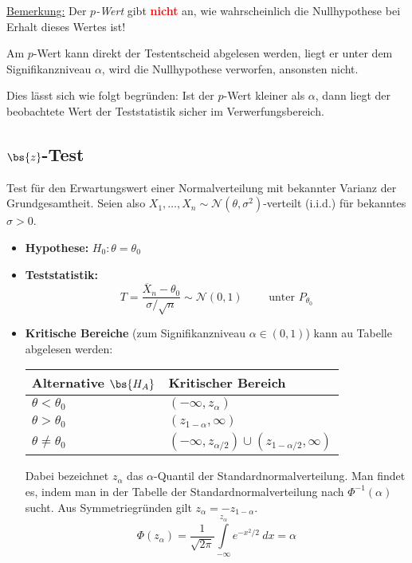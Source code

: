 \underline{Bemerkung:} Der $p$\textit{-Wert} gibt \textcolor{red}{\textbf{nicht}} an, wie wahrscheinlich die Nullhypothese bei Erhalt dieses Wertes ist!\\

\begin{lemma}
Am $p$-Wert kann direkt der Testentscheid abgelesen werden, liegt er unter dem Signifikanzniveau $\alpha$, wird die Nullhypothese verworfen, ansonsten nicht.
\end{lemma}
Dies lässt sich wie folgt begründen: Ist der $p$-Wert kleiner als $\alpha$, dann liegt der beobachtete Wert der Teststatistik sicher im Verwerfungsbereich.

\subsection{$\bs{z}$-Test}
Test für den Erwartungswert einer Normalverteilung mit bekannter Varianz der Grundgesamtheit. Seien also $X_1,\dots,X_n \sim \mathcal{N}(\theta, \sigma^2)$-verteilt (i.i.d.) für bekanntes $\sigma >0$.
\begin{itemize}
\item \textbf{Hypothese:} $H_0 : \theta = \theta_0$
\item \textbf{Teststatistik:} $$ T = \frac{\overline{X}_n - \theta_0}{\sigma / \sqrt{n}} \sim \mathcal{N}(0,1) \quad \quad \mbox{ unter } P_{\theta_0}$$
\item \textbf{Kritische Bereiche} (zum Signifikanzniveau $\alpha \in (0,1)$) kann au Tabelle abgelesen werden:
\begin{table}[htp]
\centering
\label{z-test}
\begin{tabular}{@{}ll@{}}
\toprule
\textbf{Alternative} $\bs{H_A}$                                 & \textbf{Kritischer Bereich}                            \\ \midrule
$\theta < \theta_0$ & $ (-\infty, z_\alpha)$                                 \\
$\theta > \theta_0 $                                       & $ (z_{1-\alpha}, \infty)$                              \\
$\theta \neq \theta_0$                                     & $ (-\infty, z_{\alpha/2}) \cup (z_{1-\alpha/2}, \infty)$ \\ \bottomrule
\end{tabular}
\end{table}
Dabei bezeichnet $z_\alpha$ das $\alpha$-Quantil der Standardnormalverteilung. Man findet es, indem man in der Tabelle der Standardnormalverteilung nach $\Phi^{-1}(\alpha)$ sucht. Aus Symmetriegründen gilt $z_\alpha = - z_{1-\alpha}$.
$$ \Phi(z_\alpha) = \frac{1}{\sqrt{2\pi}} \int \limits_{-\infty}^{z_\alpha} e^{-x^2/2} \ dx = \alpha$$
\end{itemize}

